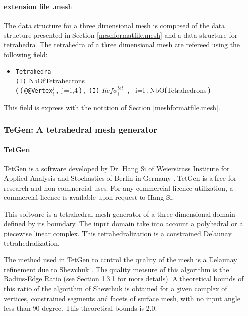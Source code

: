 \documentclass[a4paper,twoside,12pt]{book}
\begin{document}
\paragraph{extension file .mesh}
\def\Int#1{ {\tt(I)} #1}
\def\Vertex#1{{{\tt @@Vertex}#1}}
\def\Loop#1#2{{\bf\Large(}\,#1\,{\bf\Large{,\,\,}}\,#2\,{\bf\Large)}}

The data structure for a three dimensional mesh is composed of the data structure presented in Section \ref{meshformatfile.mesh}
and a data structure for tetrahedra. The tetrahedra of a three dimensional mesh are refereed using the following field:
\small
\begin{itemize}
\item {\tt{Tetrahedra}}\\
  \Int{NbOfTetrahedrons} \\
    \Loop{\Loop{\Vertex{$_i^j$}}{j=1,4}\,,\,\Int{$Ref \phi_i^{tet}$} }{ i=1\,,\,NbOfTetrahedrons}
\end{itemize}
This field is express with the notation of Section \ref{meshformatfile.mesh}.

\subsubsection{TeGen: A tetrahedral mesh generator }

\paragraph{TetGen}

TetGen is a software developed by Dr. Hang Si of Weierstrass Institute for Applied Analysis and Stochastics of
Berlin in Germany \cite{tetgen}. TetGen is a free for research and non-commercial uses. For any commercial
licence utilization, a commercial licence is available upon request to Hang Si.

This software is a tetrahedral mesh generator of a three dimensional domain defined by its boundary.
The input domain take into account a polyhedral or a piecewise linear complex.
This tetrahedralization is a constrained Delaunay tetrahedralization.

The method used in TetGen to control the quality of the mesh is a Delaunay refinement due to 
Shewchuk \cite{tetgenshewchuk}. The quality measure of this algorithm is the Radius-Edge
Ratio (see Section 1.3.1 \cite{tetgen} for more details). A theoretical bounds of this ratio of the algorithm
of Shewchuk is obtained for a given complex of vertices, constrained segments and facets of surface mesh,
with no input angle less than 90 degree. This theoretical bounds is 2.0.\\
\end{document}
